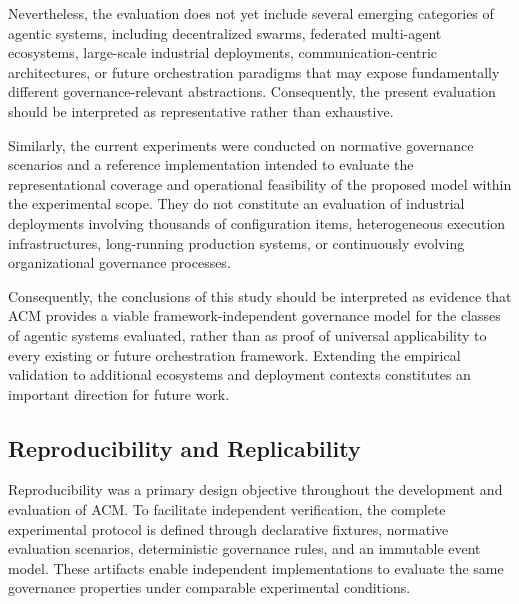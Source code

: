 \documentclass[10pt]{article}
\begin{document}
Nevertheless, the evaluation does not yet include several emerging categories of agentic systems, including decentralized swarms, federated multi-agent ecosystems, large-scale industrial deployments, communication-centric architectures, or future orchestration paradigms that may expose fundamentally different governance-relevant abstractions. Consequently, the present evaluation should be interpreted as representative rather than exhaustive.

Similarly, the current experiments were conducted on normative governance scenarios and a reference implementation intended to evaluate the representational coverage and operational feasibility of the proposed model within the experimental scope.
They do not constitute an evaluation of industrial deployments involving thousands of configuration items, heterogeneous execution infrastructures, long-running production systems, or continuously evolving organizational governance processes.

Consequently, the conclusions of this study should be interpreted as evidence that ACM provides a viable framework-independent governance model for the classes of agentic systems evaluated, rather than as proof of universal applicability to every existing or future orchestration framework. Extending the empirical validation to additional ecosystems and deployment contexts constitutes an important direction for future work.

\subsection{Reproducibility and Replicability}
\label{subsec:reproducibility}

Reproducibility was a primary design objective throughout the development and evaluation of ACM. To facilitate independent verification, the complete experimental protocol is defined through declarative fixtures, normative evaluation scenarios, deterministic governance rules, and an immutable event model. These artifacts enable independent implementations to evaluate the same governance properties under comparable experimental conditions.
\end{document}
